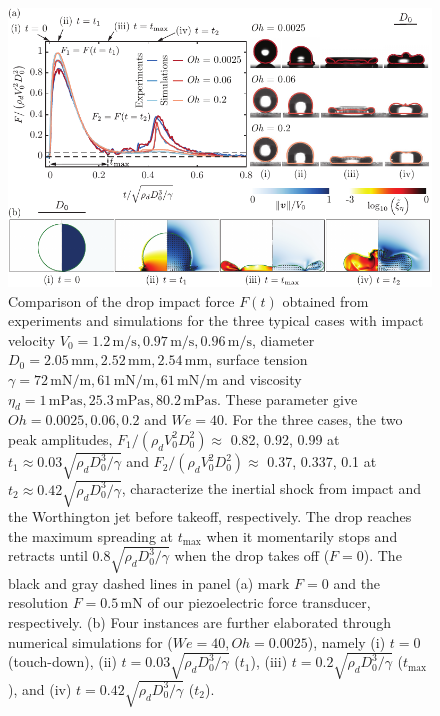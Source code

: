 \documentclass{jfm}
\begin{document}
	\begin{figure}
		\centering
		\includegraphics[width=\textwidth]{Figures/Figure1_summary_v6.pdf}
		\caption{Comparison of the drop impact force $F(t)$ obtained from experiments and simulations for the three typical cases with impact velocity $V_0 = 1.2\,\si{\meter}/\si{\second}, 0.97\,\si{\meter}/\si{\second}, 0.96\,\si{\meter}/\si{\second}$, diameter $D_0 = 2.05\,\si{\milli\meter}, 2.52\,\si{\milli\meter}, 2.54\,\si{\milli\meter}$, surface tension $\gamma = 72\,\si{\milli\newton}/\si{\meter}, 61\,\si{\milli\newton}/\si{\meter}, 61\,\si{\milli\newton}/\si{\meter}$ and viscosity $\eta_d = 1\,\si{\milli\pascal\second}, 25.3\,\si{\milli\pascal\second}, 80.2\,\si{\milli\pascal\second}$. These parameter give $Oh = 0.0025, 0.06, 0.2$ and $We = 40$.
			For the three cases, the two peak amplitudes, $F_1/(\rho_dV_0^2D_0^2) \approx$ 0.82, 0.92, 0.99 at $t_1 \approx 0.03\sqrt{\rho_dD_0^3/\gamma}$ and $F_2/(\rho_dV_0^2D_0^2) \approx$ 0.37, 0.337, 0.1 at $t_2 \approx 0.42\sqrt{\rho_dD_0^3/\gamma}$, characterize the inertial shock from impact and the Worthington jet before takeoff, respectively. 
			The drop reaches the maximum spreading at $t_{\text{max}}$ when it momentarily stops and retracts until $0.8\sqrt{\rho_dD_0^3/\gamma}$ when the drop takes off ($F = 0$). The black and gray dashed lines in panel (a) mark $F = 0$ and the resolution $F = 0.5\,\si{\milli\newton}$ of our piezoelectric force transducer, respectively.
			(b) Four instances are further elaborated through numerical simulations for ($We = 40, Oh = 0.0025$), namely (i) $t = 0$ (touch-down), (ii) $t = 0.03\sqrt{\rho_dD_0^3/\gamma}$ ($t_1$), (iii) $t = 0.2\sqrt{\rho_dD_0^3/\gamma}$ ($t_{\text{max}}$), and (iv) $t = 0.42\sqrt{\rho_dD_0^3/\gamma}$ ($t_2$).
}
\end{figure}
\end{document}
